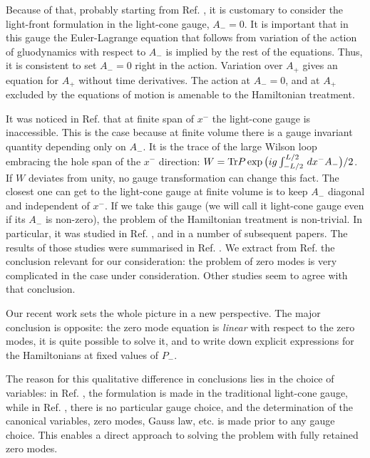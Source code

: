 \documentclass[a4paper,12pt]{article}
\begin{document}
Because of that, probably starting from Ref. \cite{Tomboulis}, 
it is customary to consider the 
light-front formulation in the light-cone gauge, $A_- = 0$. 
It is important that in 
this gauge the Euler-Lagrange equation that follows from 
variation of the action 
of gluodynamics with respect to $A_-$ is implied by the rest of the equations. 
Thus, it is consistent to set $A_- = 0$ right in the action. 
Variation over $A_+$ 
gives an equation for $A_+$ without time derivatives. The action at $A_- = 0$, 
and at $A_+$ excluded by the equations of motion is amenable to the 
Hamiltonian treatment.

It was noticed in Ref. \cite{Novozhilov} that at finite span of 
$x^-$ the light-cone gauge is inaccessible. 
This is the case because at finite volume there is a gauge invariant quantity 
depending only on $A_-$. It is the trace of the large Wilson loop 
embracing the hole 
span of the $x^-$ direction: 
$W = {\rm Tr}P\exp\big( ig\int_{-L/2}^{L/2}\,dx^-A_-\big) /2$. 
If $W$ deviates from unity, no gauge transformation can change this fact. 
The closest one can get to the light-cone gauge at finite volume 
is to keep $A_-$ 
diagonal and independent of $x^-$. If we take this gauge (we will call it 
light-cone gauge even if its $A_-$ is non-zero), 
the problem of the Hamiltonian treatment is 
non-trivial.  In particular, it was studied in Ref. \cite{Novozhilov}, 
and in a number of subsequent papers. The results of those studies 
were summarised in Ref. \cite{Prokhvat}. We extract from Ref. 
\cite{Prokhvat} the conclusion relevant for our 
consideration: the problem of zero modes is 
very complicated in the case under consideration. Other studies 
\cite{Pauli1} seem to agree with that conclusion.

Our recent work \cite{KMPV} sets the whole picture 
in a new perspective. 
The major conclusion is opposite: the zero mode equation is 
{\it linear} with respect to the zero 
modes, it is quite possible to solve it, and to write 
down explicit expressions for 
the Hamiltonians at fixed values of $P_-$.

The reason for this qualitative difference in conclusions lies 
in the choice of variables: 
in Ref. \cite{Prokhvat}, 
the formulation is made in the traditional light-cone gauge, 
while in Ref. \cite{KMPV}, 
there is no particular gauge choice, and the determination 
of the canonical variables, zero 
modes, Gauss law, etc. is made prior to any gauge choice. 
This enables a direct 
approach to solving the problem with fully retained zero modes.
\end{document}
